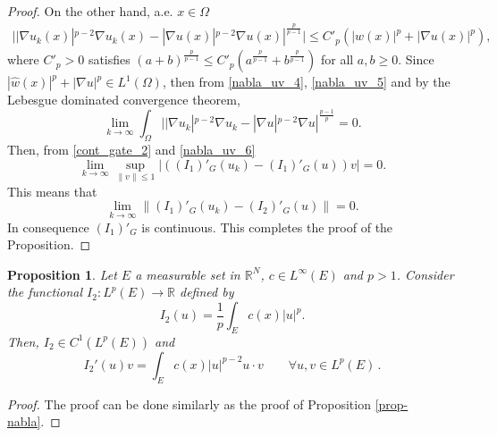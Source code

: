 \documentclass[pdflatex,sn-mathphys-num]{sn-jnl}
\theoremstyle{thmstyleone}%
\newtheorem{proposition}[theorem]{Proposition}%
\theoremstyle{thmstyletwo}%
\theoremstyle{thmstylethree}%
\theoremstyle{thmstylethree}%
\begin{document}
\begin{proof}
On the other hand, a.e. $x\in \Omega$
    \begin{align}\label{nabla_uv_4}
        ||\nabla u_k(x)|^{p-2}\nabla u_k(x) - |\nabla u(x)|^{p-2}\nabla u(x)|^{\frac{p}{p-1}}|     \leqslant C'_p(|w(x)|^p+|\nabla u(x)|^p),
    \end{align}
where $C'_p>0$ satisfies $(a+b)^\frac{p}{p-1} \leqslant C'_p(a^\frac{p}{p-1}+b^\frac{p}{p-1}) $ for all $a,b\geqslant 0$.
Since $|\hat{w}(x)|^p+|\nabla u|^p \in L^1 (\Omega)$, then from \eqref{nabla_uv_4}, \eqref{nabla_uv_5} and by the Lebesgue dominated convergence theorem, 
\begin{equation}\label{nabla_uv_6}
    \lim_{k\to \infty} \int_\Omega ||\nabla u_k|^{p-2}\nabla u_k - |\nabla u|^{p-2}\nabla u|^{\frac{p-1}{p}}   =0.
     \end{equation}
Then, from  \eqref{cont_gate_2} and \eqref{nabla_uv_6}
\begin{equation*}
\lim_{k\to \infty}    \sup_{\|v\|\leqslant 1} |((I_1)'_G(u_k)-(I_1)'_G(u))v| =0.
\end{equation*}
This means that
\begin{equation*}
\lim_{k\to \infty}    \|(I_1)'_G(u_k)-(I_2)'_G(u)\| =0.
\end{equation*}
In consequence $(I_1)'_G$ is continuous. This completes the proof of the Proposition.
\end{proof}


\begin{proposition}\label{prop-cu}
Let $E$ a measurable set in $\mathbb{R}^N$, $c\in L^\infty(E)$ and $p>1$. Consider the functional $I_2:L^{p}(E)\to \mathbb{R}$ defined by
\begin{equation*}
I_2(u)=\frac{1}{p}\int_{E} c(x)|u|^p.
\end{equation*}
Then, $I_2\in C^1(L^{p}(E))$ and 
 \begin{equation*}
I_2'(u)v=\int_{E} c(x)|u|^{p-2} u\cdot v  \qquad \forall  u, v \in L^{p}(E) \,.
\end{equation*}
\end{proposition}
\begin{proof} 
The proof can be done similarly as the proof of Proposition \ref{prop-nabla}.
\end{proof}
\end{document}
